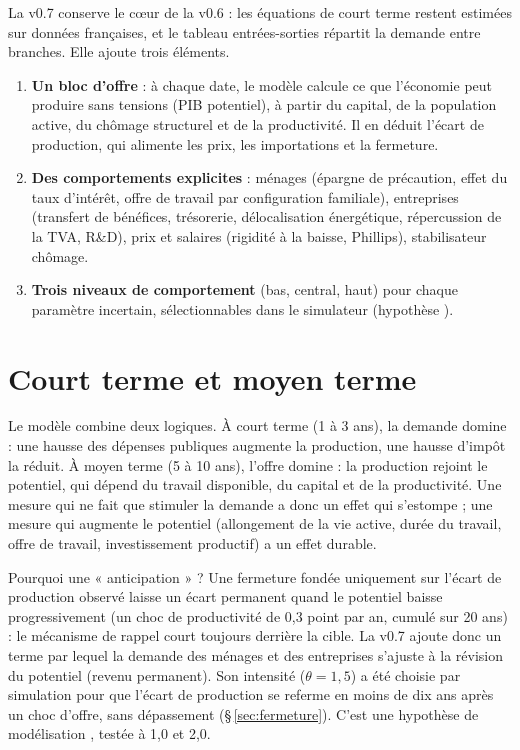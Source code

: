 La v0.7 conserve le cœur de la v0.6 : les équations de court terme restent estimées sur données françaises, et le
tableau entrées-sorties répartit la demande entre branches. Elle ajoute trois éléments.
\begin{enumerate}
\item \textbf{Un bloc d'offre} : à chaque date, le modèle calcule ce que l'économie peut produire sans tensions
(PIB potentiel), à partir du capital, de la population active, du chômage structurel et de la productivité. Il en
déduit l'écart de production, qui alimente les prix, les importations et la fermeture.
\item \textbf{Des comportements explicites} : ménages (épargne de précaution, effet du taux d'intérêt, offre de
travail par configuration familiale), entreprises (transfert de bénéfices, trésorerie, délocalisation énergétique,
répercussion de la TVA, R\&D), prix et salaires (rigidité à la baisse, Phillips), stabilisateur chômage.
\item \textbf{Trois niveaux de comportement} (bas, central, haut) pour chaque paramètre incertain, sélectionnables
dans le simulateur (hypothèse ).
\end{enumerate}

\section{Court terme et moyen terme}

Le modèle combine deux logiques. À court terme (1 à 3 ans), la demande domine : une hausse des dépenses publiques
augmente la production, une hausse d'impôt la réduit. À moyen terme (5 à 10 ans), l'offre domine : la production
rejoint le potentiel, qui dépend du travail disponible, du capital et de la productivité. Une mesure qui ne fait que
stimuler la demande a donc un effet qui s'estompe ; une mesure qui augmente le potentiel (allongement de la vie
active, durée du travail, offre de travail, investissement productif) a un effet durable.

\begin{encadre}{Pourquoi une « anticipation » ?}
Une fermeture fondée uniquement sur l'écart de production observé laisse un écart permanent quand le potentiel baisse
progressivement (un choc de productivité de 0,3 point par an, cumulé sur 20 ans) : le mécanisme de rappel court
toujours derrière la cible. La v0.7 ajoute donc un terme par lequel la demande des ménages et des entreprises
s'ajuste à la révision du potentiel (revenu permanent). Son intensité ($\theta = 1{,}5$) a été choisie par
simulation pour que l'écart de production se referme en moins de dix ans après un choc d'offre, sans dépassement
(§\,\ref{sec:fermeture}). C'est une hypothèse de modélisation , testée à 1,0 et 2,0.
\end{encadre}

